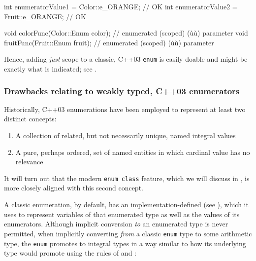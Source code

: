 \begin{emcppslisting}[emcppsbatch=e1]
int enumeratorValue1 = Color::e_ORANGE;  // OK
int enumeratorValue2 = Fruit::e_ORANGE;  // OK

void colorFunc(Color::Enum color);  // enumerated (scoped) (ù{}ù) parameter
void fruitFunc(Fruit::Enum fruit);  // enumerated (scoped) (ù{}ù) parameter
\end{emcppslisting}

\noindent Hence, adding \emph{just} scope to a classic, C++03 \lstinline!enum! is
easily doable and might be exactly what is indicated; see .

\subsubsection[Drawbacks relating to weakly typed, C++03 enumerators]{Drawbacks relating to weakly typed, C++03 enumerators}\label{drawbacks-relating-to-weakly-typed,-c++03-enumerators}

Historically, C++03 enumerations have been employed to represent at
least two distinct concepts:

\begin{enumerate}
\item{A collection of related, but not necessarily unique, named integral values}
\item{A pure, perhaps ordered, set of named entities in which cardinal value has no relevance}
\end{enumerate}

\noindent It will turn out that the modern \lstinline!enum!~\lstinline!class! feature,
which we will discuss in ,
is more closely aligned with this second
concept.

A classic enumeration, by default, has an implementation-defined
 (see ),
which it uses to represent
variables of that enumerated type as well as the values of its
enumerators. Although implicit conversion \emph{to} an enumerated type is
never permitted, when implicitly converting \emph{from} a classic
\lstinline!enum! type to some arithmetic type, the \lstinline!enum! promotes
to integral types in a way similar to how its underlying type would
promote using the rules of  and
:

